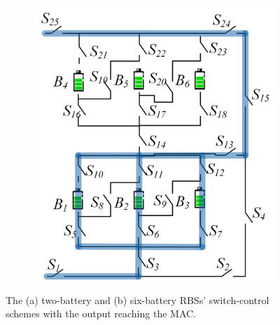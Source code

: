 \documentclass{article}
\begin{document}
\begin{figure}[htbp]
\begin{subfigure}[b]{0.31\textwidth}
        \includegraphics[width=\textwidth]{e2f3-mac.png}
        \caption{}
        \label{fig:e2f3-mac}
    \end{subfigure}
    \caption{The (a) two-battery and (b) six-battery RBSs' switch-control schemes with the output reaching the MAC.}
\end{figure}
\end{document}
